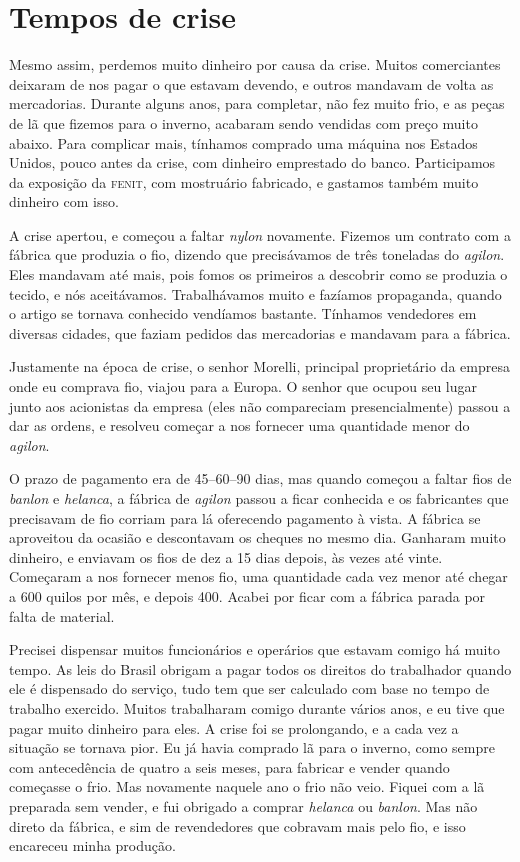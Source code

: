 \chapter{Tempos de crise}

Mesmo assim, perdemos muito dinheiro por causa da
crise. Muitos comerciantes deixaram de nos pagar o que estavam devendo, e
outros mandavam de volta as mercadorias. Durante alguns anos, para
completar, não fez muito frio, e as peças de lã que fizemos para o
inverno, acabaram sendo vendidas com preço muito abaixo. Para complicar mais, tínhamos comprado uma máquina nos Estados Unidos,
pouco antes da crise, com dinheiro emprestado do banco. Participamos da exposição da \textsc{fenit}, com mostruário fabricado, e gastamos também muito dinheiro com isso.

A crise apertou, e começou a faltar \textit{nylon} novamente. Fizemos um
contrato com a fábrica que produzia o fio, dizendo que precisávamos
de três toneladas do \textit{agilon}. Eles mandavam até mais, pois fomos os primeiros a descobrir como se produzia o tecido, e nós aceitávamos. Trabalhávamos muito e fazíamos propaganda, quando o
artigo se tornava conhecido vendíamos bastante. Tínhamos vendedores em diversas
cidades, que faziam pedidos das mercadorias e mandavam para a fábrica.

Justamente na época de crise, o senhor Morelli, principal proprietário da empresa onde
eu comprava fio, viajou para a Europa. O senhor que
ocupou seu lugar junto aos acionistas da empresa (eles 
não compareciam presencialmente) passou a dar as ordens, e resolveu
começar a nos fornecer uma quantidade menor do \textit{agilon}. 

O prazo de pagamento era de 45--60--90 dias, mas quando começou a
faltar fios de \textit{banlon} e \textit{helanca}, a fábrica de \textit{agilon} passou a ficar
conhecida e os fabricantes que precisavam de fio corriam para lá
oferecendo pagamento à vista. A fábrica se aproveitou da ocasião e descontavam os cheques no mesmo dia. Ganharam muito dinheiro, e enviavam os fios de dez a 15 dias depois, às vezes até vinte. Começaram a nos fornecer menos fio, uma quantidade cada vez menor até
chegar a 600 quilos por mês, e depois 400. Acabei por ficar com a
fábrica parada por falta de material.

Precisei dispensar muitos funcionários e operários que estavam 
comigo há muito tempo. As leis do Brasil obrigam a pagar todos os
direitos do trabalhador quando ele é dispensado do serviço, tudo tem que ser calculado com base no tempo de trabalho exercido.
Muitos trabalharam comigo durante vários anos, e eu tive que pagar muito
dinheiro para eles. A crise foi se prolongando, e a cada vez a situação se
tornava pior. Eu já havia comprado lã para o inverno, como
sempre com antecedência de quatro a seis meses, para fabricar e vender quando começasse o frio. Mas novamente naquele ano o frio não veio.
Fiquei com a lã preparada sem vender, e fui obrigado a comprar \textit{helanca} ou
\textit{banlon}. Mas não direto da fábrica, e sim de revendedores que cobravam mais
pelo fio, e isso encareceu minha produção.

